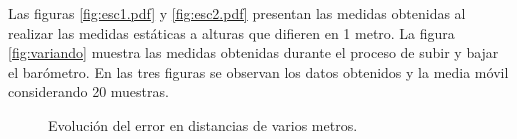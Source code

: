 \documentclass[main]{subfiles}
\begin{document}
Las figuras \ref{fig:esc1.pdf} y \ref{fig:esc2.pdf} presentan las medidas obtenidas al realizar las medidas estáticas a alturas que difieren en 1 metro. La figura \ref{fig:variando} muestra las medidas obtenidas durante el proceso de subir y bajar el barómetro. En las tres figuras se observan los datos obtenidos y la media móvil considerando 20 muestras.

\begin{figure}[!h]
\centering
  \caption{Evolución del error en distancias de varios metros.}
\label{fig:autocorr}
\vspace{-15pt}
\end{figure}
\end{document}
